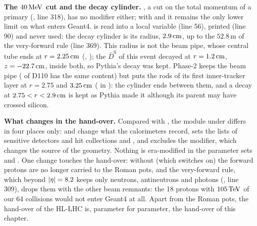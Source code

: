 \textbf{The $40\,\mathrm{MeV}$ cut and the decay cylinder.} , a cut on the total momentum of a primary
(, line 318), has no modifier either; with  and  it remains the only lower limit on what enters Geant4.  is read into a local variable
(line 56), printed (line 90) and never used: the decay cylinder is its radius, $2.9\,\mathrm{cm}$, up to the $52.8$\,m of the
very-forward rule (line 369). This radius is not the beam pipe, whose central tube ends at $r=2.25\,\mathrm{cm}$
(, ); the $\bar D^0$ of this event decayed at $r = 1.2\,\mathrm{cm}$,
$z = -22.7\,\mathrm{cm}$, inside both, so Pythia's decay was kept. Phase-2 keeps the beam pipe (
of D110 has the same content) but puts the rods of its first inner-tracker layer at $r=2.75$ and $3.25\,\mathrm{cm}$
( in ): the cylinder ends between
them, and a decay at $2.75<r<2.9\,\mathrm{cm}$ is kept as Pythia made it although its parent may have crossed silicon.

\textbf{What  changes in the hand-over.} Compared with , the module under
 differs in four places only:  and  change what the
calorimeters record,  sets the lists of sensitive detectors and hit collections and
, and  excludes the  modifier, which changes the
source of the geometry. Nothing is era-modified in the parameter sets  and .
One change touches the hand-over: without  (which  switches on) the forward
protons are no longer carried to the Roman pots, and the very-forward rule, which beyond $|\eta|=8.2$ keeps only
neutrons, antineutrons and photons (, line 309), drops them with the other beam remnants: the 18
protons with $105\,\mathrm{TeV}$ of our 64 collisions would not enter Geant4 at all. Apart from the Roman pots, the hand-over
of the HL-LHC is, parameter for parameter, the hand-over of this chapter.
